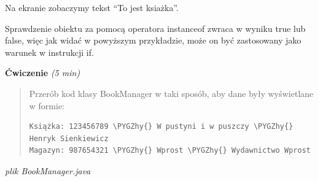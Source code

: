 \documentclass[letterpaper,10pt,english]{sphinxmanual}
\def\PYGZhy{\char`\-}
\begin{document}
Na ekranie zobaczymy tekst ``To jest ksiażka''.

Sprawdzenie obiektu za pomocą operatora instanceof zwraca w wyniku true lub false, więc jak widać w powyższym przykładzie, może on być zastosowany jako warunek w instrukcji if.

\textbf{Ćwiczenie} \emph{(5 min)}
\begin{quote}

Przerób kod klasy BookManager w taki sposób, aby dane były wyświetlane w formie:

\begin{Verbatim}[commandchars=\\\{\}]
Książka: 123456789 \PYGZhy{} W pustyni i w puszczy \PYGZhy{} Henryk Sienkiewicz
Magazyn: 987654321 \PYGZhy{} Wprost \PYGZhy{} Wydawnictwo Wprost
\end{Verbatim}
\end{quote}

\emph{plik BookManager.java}
\end{document}
